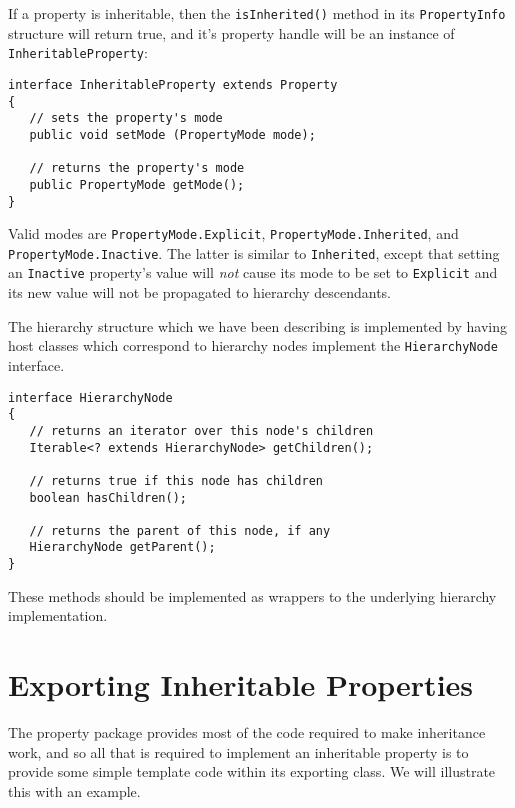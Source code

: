 If a property is inheritable, then the {\tt isInherited()}
method in its {\tt PropertyInfo} structure will return true,
and it's property handle will be an instance of 
{\tt InheritableProperty}:
\begin{lstlisting}[]
interface InheritableProperty extends Property
{
   // sets the property's mode
   public void setMode (PropertyMode mode);

   // returns the property's mode
   public PropertyMode getMode();
}    
\end{lstlisting}
Valid modes are {\tt PropertyMode.Explicit}, 
{\tt PropertyMode.Inherited}, and {\tt PropertyMode.Inactive}. The latter
is similar to {\tt Inherited}, except that setting an {\tt Inactive}
property's value will {\it not} cause its mode to be set to 
{\tt Explicit} and its new value will not be propagated to hierarchy
descendants.

The hierarchy structure which we have been describing is implemented by
having host classes which correspond to hierarchy nodes implement the
{\tt HierarchyNode} interface.
\begin{lstlisting}[]
interface HierarchyNode 
{
   // returns an iterator over this node's children
   Iterable<? extends HierarchyNode> getChildren();

   // returns true if this node has children
   boolean hasChildren();
 
   // returns the parent of this node, if any
   HierarchyNode getParent();   
}    
\end{lstlisting}

These methods should be implemented as wrappers to the underlying
hierarchy implementation.

\section{Exporting Inheritable Properties}

The property package provides most of the code required to make
inheritance work, and so all that is required to implement an
inheritable property is to provide some simple template code within
its exporting class. We will illustrate this with an example.

